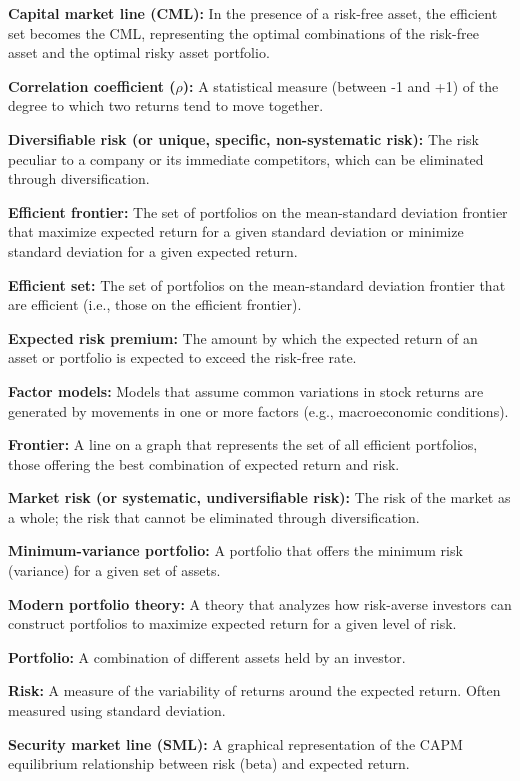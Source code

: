 \documentclass[twoside,openany]{book}
\begin{document}
\textbf{Capital market line (CML): } In the presence of a risk-free asset, the efficient set becomes the CML, representing the optimal combinations of the risk-free asset and the optimal risky asset portfolio.

\textbf{Correlation coefficient ($\rho$): } A statistical measure (between -1 and +1) of the degree to which two returns tend to move together.

\textbf{Diversifiable risk (or unique, specific, non-systematic risk): } The risk peculiar to a company or its immediate competitors, which can be eliminated through diversification.

\textbf{Efficient frontier:} The set of portfolios on the mean-standard deviation frontier that maximize expected return for a given standard deviation or minimize standard deviation for a given expected return.

\textbf{Efficient set:} The set of portfolios on the mean-standard deviation frontier that are efficient (i.e., those on the efficient frontier).

\textbf{Expected risk premium:} The amount by which the expected return of an asset or portfolio is expected to exceed the risk-free rate.

\textbf{Factor models:} Models that assume common variations in stock returns are generated by movements in one or more factors (e.g., macroeconomic conditions).

\textbf{Frontier:} A line on a graph that represents the set of all efficient portfolios, those offering the best combination of expected return and risk.

\textbf{Market risk (or systematic, undiversifiable risk): } The risk of the market as a whole; the risk that cannot be eliminated through diversification.

\textbf{Minimum-variance portfolio:} A portfolio that offers the minimum risk (variance) for a given set of assets.

\textbf{Modern portfolio theory:} A theory that analyzes how risk-averse investors can construct portfolios to maximize expected return for a given level of risk.

\textbf{Portfolio:} A combination of different assets held by an investor.

\textbf{Risk:} A measure of the variability of returns around the expected return. Often measured using standard deviation.

\textbf{Security market line (SML): } A graphical representation of the CAPM equilibrium relationship between risk (beta) and expected return.
\end{document}
